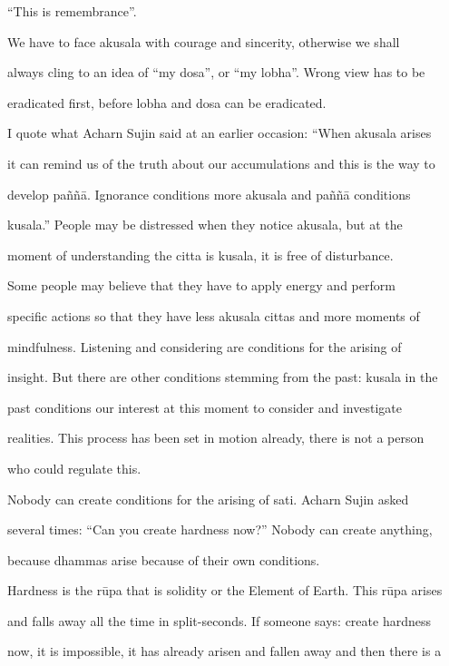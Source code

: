 “This is remembrance”. 

   We  have  to  face  akusala  with   courage  and  sincerity,  otherwise  we  shall  

always  cling  to  an  idea  of  “my  dosa”,  or  “my  lobha”. Wrong view has  to be  

eradicated first, before lobha and dosa can be eradicated. 

   I quote what Acharn Sujin said at an earlier occasion: “When akusala arises  

it can remind us of the truth about our accumulations and this is the way to  

develop   paññā.   Ignorance   conditions   more   akusala   and   paññā   conditions  

kusala.”   People   may   be   distressed   when   they   notice   akusala,   but   at   the  

moment of understanding the citta is kusala, it is free of disturbance. 

   Some  people   may   believe   that   they   have   to   apply   energy   and   perform  

specific  actions  so  that  they  have  less  akusala  cittas  and  more  moments  of  

mindfulness.   Listening   and   considering   are   conditions   for   the   arising   of  

insight. But there are other conditions stemming from the past: kusala in the  

past   conditions   our   interest   at   this   moment   to   consider   and   investigate  

realities.  This  process has been  set  in  motion  already,  there  is  not  a  person  

who could regulate this. 

   Nobody  can  create  conditions  for  the  arising  of  sati.  Acharn   Sujin  asked  

several times:  “Can you  create hardness  now?” Nobody  can  create  anything,  

because dhammas arise because of their own conditions. 

   Hardness is the rūpa that is solidity or the Element of Earth. This rūpa arises  

and falls away all the time in split-seconds. If  someone says: create hardness  

now, it is impossible, it has already arisen and fallen away and then there is a  

